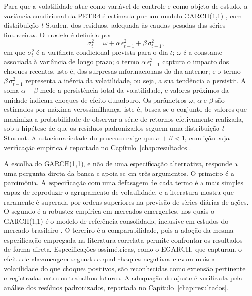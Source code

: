 Para que a volatilidade atue como variável de controle e como objeto de estudo, a variância condicional da PETR4 é estimada por um modelo GARCH(1,1) \cite{bollerslev_generalized_1986}, com distribuição \textit{t}-Student dos resíduos, adequada às caudas pesadas das séries financeiras. O modelo é definido por
\begin{equation}
\sigma_t^2 = \omega + \alpha\,\epsilon_{t-1}^2 + \beta\,\sigma_{t-1}^2,
\end{equation}
em que $\sigma_t^2$ é a variância condicional prevista para o dia $t$; $\omega$ é a constante associada à variância de longo prazo; o termo $\alpha\,\epsilon_{t-1}^2$ captura o impacto dos choques recentes, isto é, das surpresas informacionais do dia anterior; e o termo $\beta\,\sigma_{t-1}^2$ representa a inércia da volatilidade, ou seja, a sua tendência a persistir. A soma $\alpha + \beta$ mede a persistência total da volatilidade, e valores próximos da unidade indicam choques de efeito duradouro. Os parâmetros $\omega$, $\alpha$ e $\beta$ são estimados por máxima verossimilhança, isto é, busca-se o conjunto de valores que maximiza a probabilidade de observar a série de retornos efetivamente realizada, sob a hipótese de que os resíduos padronizados seguem uma distribuição \textit{t}-Student. A estacionariedade do processo exige que $\alpha + \beta < 1$, condição cuja verificação empírica é reportada no Capítulo~\ref{chap:resultados}.

A escolha do GARCH(1,1), e não de uma especificação alternativa, responde a uma pergunta direta da banca e apoia-se em três argumentos. O primeiro é a parcimônia. A especificação com uma defasagem de cada termo é a mais simples capaz de reproduzir o agrupamento de volatilidade, e a literatura mostra que raramente é superada por ordens superiores na previsão de séries diárias de ações. O segundo é a robustez empírica em mercados emergentes, nos quais o GARCH(1,1) é o modelo de referência consolidado, inclusive em estudos do mercado brasileiro \cite{silva_o_2018}. O terceiro é a comparabilidade, pois a adoção da mesma especificação empregada na literatura correlata permite confrontar os resultados de forma direta. Especificações assimétricas, como o EGARCH, que capturam o efeito de alavancagem segundo o qual choques negativos elevam mais a volatilidade do que choques positivos, são reconhecidas como extensão pertinente e registradas entre os trabalhos futuros. A adequação do ajuste é verificada pela análise dos resíduos padronizados, reportada no Capítulo~\ref{chap:resultados}.

